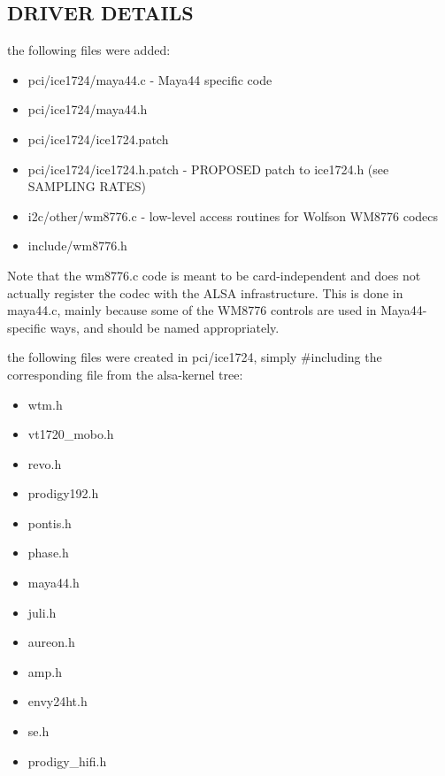 \documentclass[a4paper,8pt,english]{sphinxmanual}
\begin{document}
\subsection{DRIVER DETAILS}
\label{sound/cards/maya44:driver-details}
the following files were added:
\begin{itemize}
\item {} 
pci/ice1724/maya44.c - Maya44 specific code

\item {} 
pci/ice1724/maya44.h

\item {} 
pci/ice1724/ice1724.patch

\item {} 
pci/ice1724/ice1724.h.patch - PROPOSED patch to ice1724.h (see SAMPLING RATES)

\item {} 
i2c/other/wm8776.c - low-level access routines for Wolfson WM8776 codecs

\item {} 
include/wm8776.h

\end{itemize}

Note that the wm8776.c code is meant to be card-independent and does not actually register the codec with the ALSA infrastructure.
This is done in maya44.c, mainly because some of the WM8776 controls are used in Maya44-specific ways, and should be named appropriately.

the following files were created in pci/ice1724, simply \#including the corresponding file from the alsa-kernel tree:
\begin{itemize}
\item {} 
wtm.h

\item {} 
vt1720\_mobo.h

\item {} 
revo.h

\item {} 
prodigy192.h

\item {} 
pontis.h

\item {} 
phase.h

\item {} 
maya44.h

\item {} 
juli.h

\item {} 
aureon.h

\item {} 
amp.h

\item {} 
envy24ht.h

\item {} 
se.h

\item {} 
prodigy\_hifi.h

\end{itemize}
\end{document}
